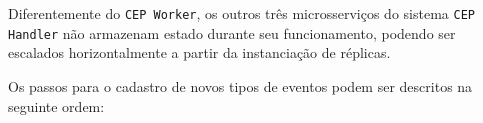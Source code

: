 

Diferentemente do \texttt{CEP Worker}, os outros três microsserviços do sistema \texttt{CEP Handler} não armazenam estado durante seu funcionamento, podendo ser escalados horizontalmente a partir da instanciação de réplicas. %



Os passos para o cadastro de novos tipos de eventos podem ser descritos na seguinte ordem:

